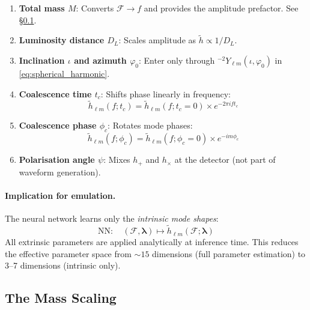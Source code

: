 \documentclass[11pt,a4paper]{article}
\newcommand{\htlm}{\tilde{h}_{\ell m}}
\newcommand{\Ylm}{{}^{-2}Y_{\ell m}}
\newcommand{\veclambda}{\bm{\lambda}}
\newcommand{\Mf}{\mathcal{F}}
\begin{document}
\begin{enumerate}
    \item \textbf{Total mass $M$}: Converts $\Mf \to f$ and provides the amplitude prefactor. See \S\ref{sec:mass_scaling}.

    \item \textbf{Luminosity distance $D_L$}: Scales amplitude as $\tilde{h} \propto 1/D_L$.

    \item \textbf{Inclination $\iota$ and azimuth $\varphi_0$}: Enter only through $\Ylm(\iota, \varphi_0)$ in \eqref{eq:spherical_harmonic}.

    \item \textbf{Coalescence time $t_c$}: Shifts phase linearly in frequency:
    \begin{equation}
        \htlm(f; t_c) = \htlm(f; t_c = 0) \times e^{-2\pi i f t_c}
        \label{eq:tc_shift}
    \end{equation}

    \item \textbf{Coalescence phase $\phi_c$}: Rotates mode phases:
    \begin{equation}
        \htlm(f; \phi_c) = \htlm(f; \phi_c = 0) \times e^{-i m \phi_c}
        \label{eq:phic_shift}
    \end{equation}

    \item \textbf{Polarisation angle $\psi$}: Mixes $h_+$ and $h_\times$ at the detector (not part of waveform generation).
\end{enumerate}

\paragraph{Implication for emulation.} The neural network learns only the \emph{intrinsic mode shapes}:
\begin{equation}
    \text{NN}: \quad (\Mf, \veclambda) \mapsto \htlm(\Mf; \veclambda)
\end{equation}
All extrinsic parameters are applied analytically at inference time. This reduces the effective parameter space from $\sim 15$ dimensions (full parameter estimation) to 3--7 dimensions (intrinsic only).

\subsection{The Mass Scaling}
\label{sec:mass_scaling}
\end{document}
